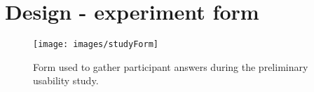 \chapter{Design - experiment form}
\label{app:studyForm}

\begin{figure}[htb]
  \centering
    \texttt{[image: images/studyForm]}
  \caption{Form used to gather participant answers during the preliminary usability study.}
  \label{studyScreenshot}
\end{figure}
